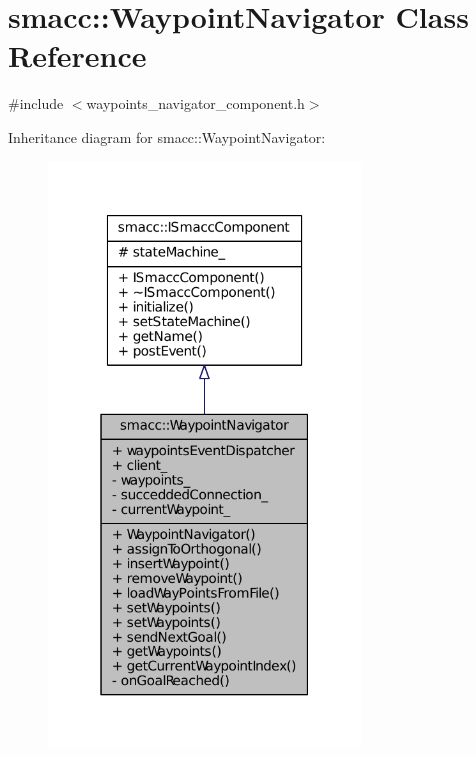 \hypertarget{classsmacc_1_1WaypointNavigator}{}\section{smacc\+:\+:Waypoint\+Navigator Class Reference}
\label{classsmacc_1_1WaypointNavigator}


{\ttfamily \#include $<$waypoints\+\_\+navigator\+\_\+component.\+h$>$}



Inheritance diagram for smacc\+:\+:Waypoint\+Navigator\+:
\nopagebreak
\begin{figure}[H]
\begin{center}
\leavevmode
\includegraphics[width=235pt]{classsmacc_1_1WaypointNavigator__inherit__graph}
\end{center}
\end{figure}


